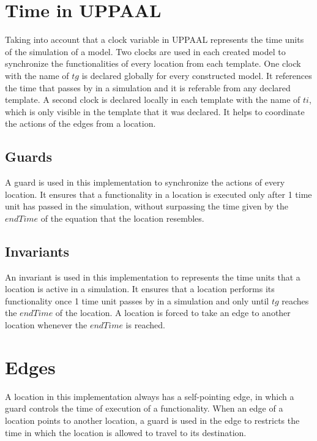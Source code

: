 \section{Time in UPPAAL}
Taking into account that a clock variable in UPPAAL represents the time units of the simulation of a model.
%
Two clocks are used in each created model to synchronize the functionalities of every location from each template.
%
One clock with the name of $tg$ is declared globally for every constructed model. 
%
It references the time that passes by in a simulation and it is referable from any declared template. 
%
A second clock is declared locally in each template with the name of $ti$, which is only visible in the template that it was declared.
%
It helps to coordinate the actions of the edges from a location. 

\subsection{Guards}
A guard is used in this implementation to synchronize the actions of every location. 
%
It ensures that a functionality in a location is executed only after 1 time unit has passed in the simulation, without surpassing the time given by the $endTime$ of the equation that the location resembles. 

\subsection{Invariants}
An invariant is used in this implementation to represents the time units that a location is active in a simulation.
%
It ensures that a location performs its functionality once 1 time unit passes by in a simulation and only until $tg$ reaches the $endTime$ of the location. 
%
A location is forced to take an edge to another location whenever the $endTime$ is reached. 

\section {Edges}
A location in this implementation always has a self-pointing edge, in which a guard controls the time of execution of a functionality. 
%
%
When an edge of a location points to another location, a guard is used in the edge to restricts the time in which the location is allowed to travel to its destination.
%

